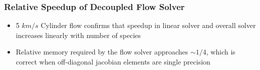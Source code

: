 \documentclass{beamer}
\begin{document}
\begin{frame}
  \frametitle{Relative Speedup of Decoupled Flow Solver}
  \vspace{-0.25cm}
  \begin{figure}[h]
    \centering
  \end{figure}
  \begin{itemize}
    \item 5 $km/s$ Cylinder flow confirms that speedup in linear solver and
      overall solver increases linearly with number of species
    \item Relative memory required by the flow solver approaches $\sim 1/4$,
      which is correct when off-diagonal jacobian elements are single precision
  \end{itemize}
\end{frame}
\end{document}
